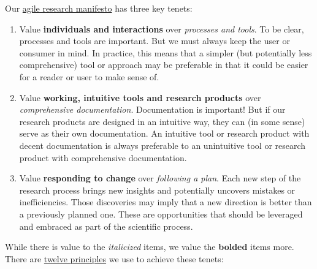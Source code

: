 \documentclass{tufte-book} %
\begin{document}
Our \href{http://agilemanifesto.org/}{agile research manifesto} has three key
tenets:
\begin{enumerate}
\item Value \textbf{individuals and interactions} over
  \textit{processes and tools}.  To be clear, processes and tools are
  important.  But we must always keep the user or consumer in mind.
  In practice, this means that a simpler (but potentially less
  comprehensive) tool or approach may be preferable in that it could
  be easier for a reader or user to make sense of.
\item Value \textbf{working, intuitive tools and research products}
  over \textit{comprehensive documentation}.  Documentation is
  important!  But if our research products are designed in an
  intuitive way, they can (in some sense) serve as their own
  documentation.  An intuitive tool or research product with decent
  documentation is always preferable to an unintuitive tool or
  research product with comprehensive documentation.
\item Value \textbf{responding to change} over \textit{following a
    plan}.  Each new step of the research process brings new insights
  and potentially uncovers mistakes or inefficiencies.  Those
  discoveries may imply that a new direction is better than a
  previously planned one.  These are opportunities that should be
  leveraged and embraced as part of the scientific process.
\end{enumerate}
While there is value to the \textit{italicized} items, we value the
\textbf{bolded} items more.  There are \href{http://www.agilemanifesto.org/principles.html}{twelve
  principles} we use to achieve these tenets:
\end{document}
